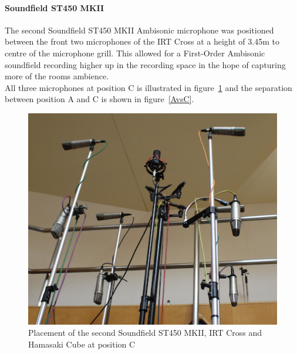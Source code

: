 			\paragraph{Soundfield ST450 MKII}

			The second Soundfield ST450 MKII Ambisonic microphone was positioned between the front two microphones of the IRT Cross at a height of 3.45m to centre of the microphone grill. This allowed for a First-Order Ambisonic soundfield recording higher up in the recording space in the hope of capturing more of the rooms ambience. \\

			All three microphones at position C is illustrated in figure~\ref{pos3} and the separation between position A and C is shown in figure~\ref{AvsC}.\\

			\begin{figure}[h]
			\begin{center}
				\includegraphics[width = \linewidth]{images/other/positionC.png}
				\caption{Placement of the second Soundfield ST450 MKII, IRT Cross and Hamasaki Cube at position C}
				\label{pos3}
			\end{center}
			\end{figure}


